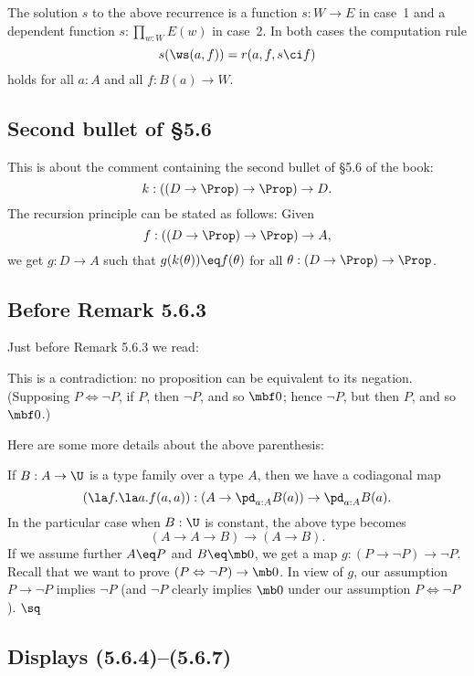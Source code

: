 \documentclass[12pt]{article}
\begin{document}
The solution $s$ to the above recurrence is a function $s:W\to E$ in case~1 and a dependent function $s:\prod_{w:W}E(w)$ in case~2. In both cases the computation rule 
$$
s(\ws(a,f))=r(a,f,s\ci f)
$$ 
holds for all $a:A$ and all $f:B(a)\to W$.


\subsection{Second bullet of \S5.6}%

This is about the comment containing the second bullet of \S5.6 of the book:
$$
k:((D\to\Prop)\to\Prop)\to D.
$$ 
The recursion principle can be stated as follows: Given 
$$
f:((D\to\Prop)\to\Prop)\to A,
$$ 
we get $g:D\to A$ such that $g(k(\theta))\eq f(\theta)$ for all $\theta:(D\to\Prop)\to\Prop$.


\subsection{Before Remark 5.6.3}%

Just before Remark 5.6.3 we read:

\nn\guillemotleft This is a contradiction: no proposition can be equivalent to its negation. (Supposing $P\Leftrightarrow\neg P$, if $P$, then $\neg P$, and so $\mbf0$; hence $\neg P$, but then $P$, and so $\mbf0$.)\guillemotright

Here are some more details about the above parenthesis:

If $B:A\to\U$ is a type family over a type $A$, then we have a codiagonal map 
\begin{equation}\label{563}
(\la f.\la a.f(a,a)):\left(A\to\pd_{a:A}B(a)\right)\to\pd_{a:A}B(a).
\end{equation} 
In the particular case when $B:\U$ is constant, the above type becomes 
$$
(A\to A\to B)\to(A\to B).
$$ 
If we assume further $A\eq P$ and $B\eq\mb0$, we get a map $g:(P\to\neg P)\to\neg P$. Recall that we want to prove $(P\Leftrightarrow\neg P)\to\mb0$. In view of $g$, our assumption $P\to\neg P$ implies $\neg P$ (and $\neg P$ clearly implies $\mb0$ under our assumption $P\Leftrightarrow\neg P$). $\sq$


\subsection{Displays (5.6.4)--(5.6.7)}%
\end{document}
